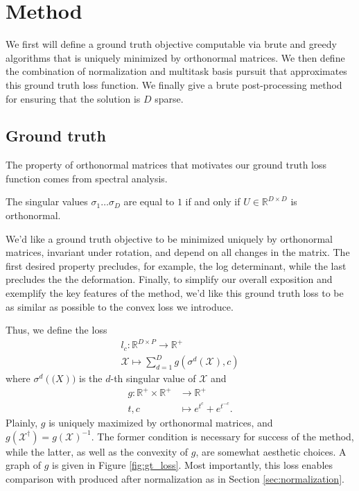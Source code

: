 \section{Method}

We first will define a ground truth objective computable via brute and greedy algorithms that is uniquely minimized by orthonormal matrices.
We then define the combination of normalization and multitask basis pursuit that approximates this ground truth loss function.
We finally give a brute post-processing method for ensuring that the solution is $D$ sparse.

\subsection{Ground truth}
\label{sec:ground_truth}

The property of orthonormal matrices that motivates our ground truth loss function comes from spectral analysis.
\begin{proposition}
\label{prop:orthonormal_spectrum}
The singular values $\sigma_1 \dots \sigma_D$ are equal to $1$ if and only if $U \in \mathbb{R}^{D \times D}$ is orthonormal.
\end{proposition}

We'd like a ground truth objective to be minimized uniquely by orthonormal matrices, invariant under rotation, and depend on all changes in the matrix.
The first desired property precludes, for example, the log determinant, while the last precludes the the deformation. %
Finally, to simplify our overall exposition and exemplify the key features of the method, we'd like this ground truth loss to be as similar as possible to the convex loss we introduce.

Thus, we define the loss
\begin{align}
l_{c}: \mathbb R^{D \times P} \to \mathbb R^{+} \\
\mathcal X \mapsto \sum_{d = 1}^D g(\sigma^d(\mathcal X), c)
\end{align}
where $\sigma^d (\mathcal (X))$ is the $d$-th singular value of $\mathcal X$ and
\begin{align}
g: \mathbb R^+ \times \mathbb R^+ &\to \mathbb R^+ \\
t,c &\mapsto e^{t^c} + e^{t^{-c}}.
\end{align}
Plainly, $g$ is uniquely maximized by orthonormal matrices, and $g(\mathcal X^{\dagger}) = g(\mathcal X)^{-1}$.
The former condition is necessary for success of the method, while the latter, as well as the convexity of $g$, are somewhat aesthetic choices.
A graph of $g$ is given in Figure \ref{fig:gt_loss}.
Most importantly, this loss enables comparison with produced after normalization as in Section \ref{sec:normalization}.

